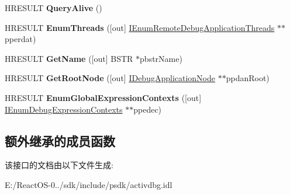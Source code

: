 \begin{DoxyCompactItemize}
\item 
\mbox{\label{interface_i_remote_debug_application_ad3590cac6307e9d8bae403491034ed8e}} 
H\+R\+E\+S\+U\+LT {\bfseries Query\+Alive} ()
\item 
\mbox{\label{interface_i_remote_debug_application_a7814699abc522d4194359be069322358}} 
H\+R\+E\+S\+U\+LT {\bfseries Enum\+Threads} (\mbox{[}out\mbox{]} \hyperlink{interface_i_enum_remote_debug_application_threads}{I\+Enum\+Remote\+Debug\+Application\+Threads} $\ast$$\ast$pperdat)
\item 
\mbox{\label{interface_i_remote_debug_application_a5127645f5f7a2a4152ef3688e79e8bcf}} 
H\+R\+E\+S\+U\+LT {\bfseries Get\+Name} (\mbox{[}out\mbox{]} B\+S\+TR $\ast$pbstr\+Name)
\item 
\mbox{\label{interface_i_remote_debug_application_aba2c2053464c340758aa7b89a43ba125}} 
H\+R\+E\+S\+U\+LT {\bfseries Get\+Root\+Node} (\mbox{[}out\mbox{]} \hyperlink{interface_i_debug_application_node}{I\+Debug\+Application\+Node} $\ast$$\ast$ppdan\+Root)
\item 
\mbox{\label{interface_i_remote_debug_application_ab3cab0f132f54783c06c76613506687f}} 
H\+R\+E\+S\+U\+LT {\bfseries Enum\+Global\+Expression\+Contexts} (\mbox{[}out\mbox{]} \hyperlink{interface_i_enum_debug_expression_contexts}{I\+Enum\+Debug\+Expression\+Contexts} $\ast$$\ast$ppedec)
\end{DoxyCompactItemize}
\subsection*{额外继承的成员函数}


该接口的文档由以下文件生成\+:\begin{DoxyCompactItemize}
\item 
E\+:/\+React\+O\+S-\/0../sdk/include/psdk/activdbg.\+idl\end{DoxyCompactItemize}
